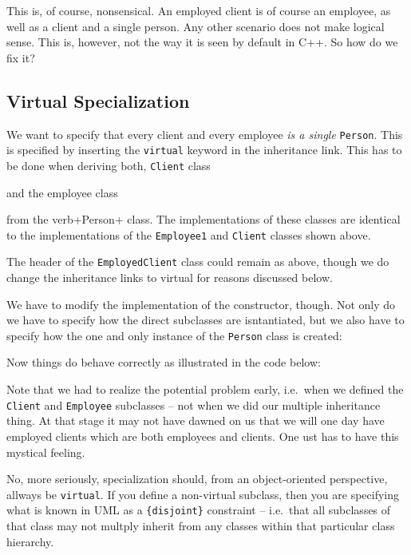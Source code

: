 This is, of course, nonsensical. An employed client is of course 
an employee, as well as a client and a single person. Any other
scenario does not make logical sense. This is, however, not the
way it is seen by default in C++. So how do we fix it?


\subsection{Virtual Specialization}

We want to specify that every client and every employee {\em is a single}
\verb+Person+. This is specified by inserting the \verb+virtual+ keyword
in the inheritance link. This has to be done when deriving both, \verb+Client+
class

\noindent {\small }

and the employee class

\noindent {\small }

from the verb+Person+ class. The implementations of these classes are identical
to the implementations of the \verb+Employee1+ and \verb+Client+ classes
shown above. 

The header of the \verb+EmployedClient+ class could remain as above, though
we do change the inheritance links to virtual for reasons discussed below.

\noindent {\small }

We have to modify the implementation of the constructor, though. Not only
do we have to specify how the direct subclasses are isntantiated, but we
also have to specify how the one and only instance of the \verb+Person+
class is created:

\noindent {\small }

Now things do behave correctly as illustrated in the code below:

\noindent {\small }

Note that we had to realize the potential problem early, i.e.\ when we 
defined the \verb+Client+ and \verb+Employee+ subclasses -- not when we 
did our multiple inheritance thing. At that stage it may not have dawned 
on us that we will one day have employed clients which are both employees 
and clients. One ust has to have this mystical feeling.

No, more seriously, specialization should, from an object-oriented 
perspective, allways be \verb+virtual+. If you define a non-virtual 
subclass, then you are specifying what is known in UML as a 
\verb+{disjoint}+ constraint -- i.e.\ that all subclasses of that class
may not multply inherit from any classes within that particular class 
hierarchy.

